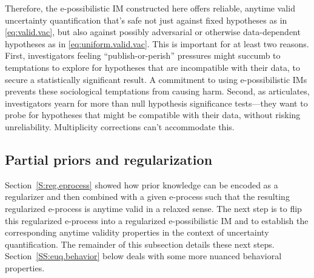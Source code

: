 \documentclass[a4paper, 12pt]{article}
\theoremstyle{plain}
\theoremstyle{definition}
\theoremstyle{remark}
\begin{document}
Therefore, the e-possibilistic IM constructed here offers reliable, anytime valid uncertainty quantification that's safe not just against fixed hypotheses as in \eqref{eq:valid.vac}, but also against possibly adversarial or otherwise data-dependent hypotheses as in \eqref{eq:uniform.valid.vac}.  This is important for at least two reasons.  First, investigators feeling ``publish-or-perish'' pressures might succumb to temptations to explore for hypotheses that are incompatible with their data, to secure a statistically significant result.  A commitment to using e-possibilistic IMs prevents these sociological temptations from causing harm. Second, as \citet{mayo.book.2018} articulates, investigators yearn for more than null hypothesis significance tests---they want to probe 
for hypotheses that might be compatible with their data, without risking unreliability.  Multiplicity corrections can't accommodate this.





\subsection{Partial priors and regularization}
\label{SS:euq.properties}

Section~\ref{S:reg.eprocess} showed how prior knowledge can be encoded as a regularizer and then combined with a given e-process such that the resulting regularized e-process is anytime valid in a relaxed sense.  The next step is to flip this regularized e-process into a regularized e-possibilistic IM and to establish the corresponding anytime validity properties in the context of uncertainty quantification.  The remainder of this subsection details these next steps.  Section~\ref{SS:euq.behavior} below deals with some more nuanced behavioral properties.
\end{document}
